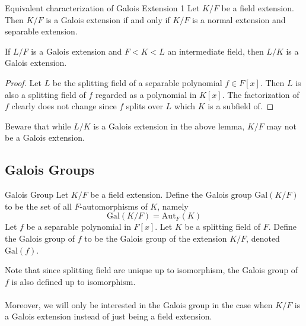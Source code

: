 \documentclass[a4paper]{article}
\begin{document}
\begin{prp}{Equivalent characterization of Galois Extension 1}{} Let $K/F$ be a field extension. Then $K/F$ is a Galois extension if and only if $K/F$ is a normal extension and separable extension. 
\end{prp}

\begin{lmm}{}{} If $L/F$ is a Galois extension and $F<K<L$ an intermediate field, then $L/K$ is a Galois extension. \tcbline
\begin{proof}
Let $L$ be the splitting field of a separable polynomial $f\in F[x]$. Then $L$ is also a splitting field of $f$ regarded as a polynomial in $K[x]$. The factorization of $f$ clearly does not change since $f$ splits over $L$ which $K$ is a subfield of. 
\end{proof}
\end{lmm}

Beware that while $L/K$ is a Galois extension in the above lemma, $K/F$ may not be a Galois extension. 

\subsection{Galois Groups}
\begin{defn}{Galois Group}{} Let $K/F$ be a field extension. Define the Galois group $\text{Gal}(K/F)$ to be the set of all $F$-automorphisms of $K$, namely $$\text{Gal}(K/F)=\text{Aut}_F(K)$$ Let $f$ be a separable polynomial in $F[x]$. Let $K$ be a splitting field of $F$. Define the Galois group of $f$ to be the Galois group of the extension $K/F$, denoted $\text{Gal}(f)$. 
\end{defn}

Note that since splitting field are unique up to isomorphism, the Galois group of $f$ is also defined up to isomorphism. \\~\\
Moreover, we will only be interested in the Galois group in the case when $K/F$ is a Galois extension instead of just being a field extension. 
\end{document}
